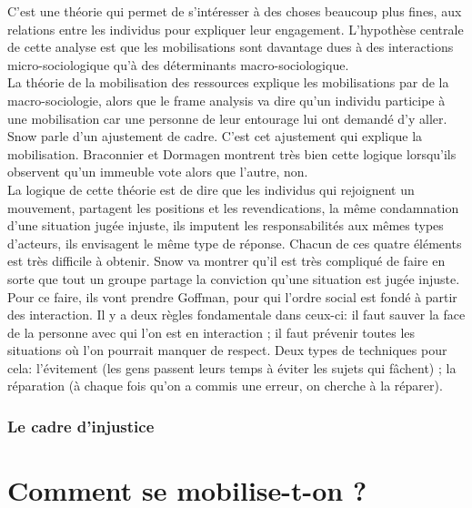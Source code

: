 \documentclass[10pt, a4paper, openany]{book}
\begin{document}
C'est une théorie qui permet de s'intéresser à des choses beaucoup plus fines, aux relations entre les individus pour expliquer leur engagement. L'hypothèse centrale de cette analyse est que les mobilisations sont davantage dues à des interactions micro-sociologique qu'à des déterminants macro-sociologique. \\
La théorie de la mobilisation des ressources explique les mobilisations par de la macro-sociologie, alors que le frame analysis va dire qu'un individu participe à une mobilisation car une personne de leur entourage lui ont demandé d'y aller. \\
Snow parle d'un ajustement de cadre. C'est cet ajustement qui explique la mobilisation. Braconnier et Dormagen montrent très bien cette logique lorsqu'ils observent qu'un immeuble vote alors que l'autre, non. \\
La logique de cette théorie est de dire que les individus qui rejoignent un mouvement, partagent les positions et les revendications, la même condamnation d'une situation jugée injuste, ils imputent les responsabilités aux mêmes types d'acteurs, ils envisagent le même type de réponse. Chacun de ces quatre éléments est très difficile à obtenir. Snow va montrer qu'il est très compliqué de faire en sorte que tout un groupe partage la conviction qu'une situation est jugée injuste. Pour ce faire, ils vont prendre Goffman, pour qui l'ordre social est fondé à partir des interaction. Il y a deux règles fondamentale dans ceux-ci: il faut sauver la face de la personne avec qui l'on est en interaction ; il faut prévenir toutes les situations où l'on pourrait manquer de respect. Deux types de techniques pour cela: l'évitement (les gens passent leurs temps à éviter les sujets qui fâchent) ; la réparation (à chaque fois qu'on a commis une erreur, on cherche à la réparer). 


\section{Le cadre d'injustice}















\part{Comment se mobilise-t-on ?}
\end{document}
